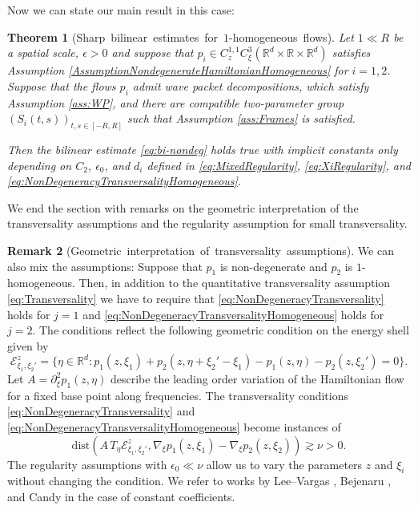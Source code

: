 \documentclass{amsart}
\newtheorem{theorem}{Theorem}[section]
\theoremstyle{definition}
\newtheorem{remark}[theorem]{Remark}
\newcommand{\R}{\mathbb{R}}
\begin{document}
Now we can state our main result in this case:

\begin{theorem}[Sharp~bilinear~estimates~for~$1$-homogeneous~flows]
\label{thm:GeneralizationBilinearCone}
Let $1 \ll R$ be a spatial scale, $\epsilon > 0$ and suppose that $p_i \in C_{z}^{1,1} C^3_{\xi}(\R^d \times \R \times \R^d)$ satisfies Assumption \ref{AssumptionNondegenerateHamiltonianHomogeneous} for $i=1,2$.
Suppose that the flows $p_i$ admit wave packet decompositions, which satisfy Assumption \ref{ass:WP}, and there are compatible two-parameter group $(S_i(t,s))_{t,s \in [-R,R]}$ such that Assumption \ref{ass:Frames} is satisfied.

Then the bilinear estimate \eqref{eq:bi-nondeg} 
holds true with implicit constants only depending on $C_2$, $\epsilon_0$, and $d_i$ defined in \eqref{eq:MixedRegularity}, \eqref{eq:XiRegularity}, and \eqref{eq:NonDegeneracyTransversalityHomogeneous}.
\end{theorem}

We end the section with remarks on the geometric interpretation of the transversality assumptions and the regularity assumption for small transversality.

\begin{remark}[Geometric~interpretation~of~transversality~assumptions]
We can also mix the assumptions: Suppose that $p_1$ is non-degenerate and $p_2$ is $1$-homo\-geneous. Then, in addition to the quantitative transversality assumption \eqref{eq:Transversality} we have to require that \eqref{eq:NonDegeneracyTransversality} holds for $j=1$ and \eqref{eq:NonDegeneracyTransversalityHomogeneous} holds for $j=2$. The conditions reflect the following geometric condition on the energy shell
given by
\begin{equation*}
\mathcal{E}^z_{\xi_1,\xi_2'} = \{ \eta \in \R^d : p_1(z,\xi_1) + p_2(z,\eta+\xi_2'-\xi_1) - p_1(z,\eta) - p_2(z,\xi_2') = 0 \}.
\end{equation*}
Let $A = \partial^2_{\xi} p_1(z,\eta)$ describe the leading order variation of the Hamiltonian flow for a fixed base point along frequencies. 
The transversality conditions \eqref{eq:NonDegeneracyTransversality} and \eqref{eq:NonDegeneracyTransversalityHomogeneous} become instances of
\begin{equation*}
\text{dist}(A \, T_{\eta} \mathcal{E}^z_{\xi_1,\xi_2'}, \nabla_{\xi} p_1(z,\xi_1) - \nabla_{\xi} p_2(z,\xi_2) ) \gtrsim \nu > 0.
\end{equation*}
The regularity assumptions with $\epsilon_0 \ll \nu$ allow us to vary the parameters $z$ and $\xi_i$ without changing the condition. We refer to works by Lee--Vargas \cite{LeeVargas2010}, Bejenaru \cite{Bejenaru2017}, and Candy \cite{Candy2019} in the case of constant coefficients.
\end{remark}
\end{document}
